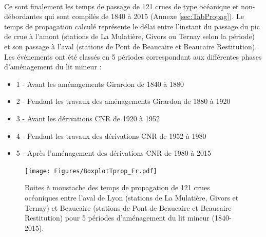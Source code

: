 \documentclass[11pt]{article}
\begin{document}
	\paragraph{} Ce sont finalement les temps de passage de 121 crues de type océanique et non-débordantes qui sont compilés de 1840 à 2015 (Annexe \ref{sec:TabPropag}). Le temps de propagation calculé représente le délai entre l'instant du passage du pic de crue à l'amont (stations de La Mulatière, Givors ou Ternay selon la période) et son passage à l'aval (stations de Pont de Beaucaire et Beaucaire Restitution). Les événements ont été classés en 5 périodes correspondant aux différentes phases d'aménagement du lit mineur : 
	\begin{itemize}
		\item 1 - Avant les aménagements Girardon de 1840 à 1880
		\item 2 - Pendant les travaux des aménagements Girardon de 1880 à 1920
		\item 3 - Avant les dérivations CNR de 1920 à 1952
		\item 4 - Pendant les travaux des dérivations CNR de 1952 à 1980
		\item 5 - Après l'aménagement des dérivations CNR de 1980 à 2015
	\end{itemize}

	\begin{figure}[h!]
		\centering
			\texttt{[image: Figures/BoxplotTprop\_Fr.pdf]}
	        \caption{Boites à moustache des temps de propagation de 121 crues océaniques entre l'aval de Lyon (stations de La Mulatière, Givors et Ternay) et Beaucaire (stations de Pont de Beaucaire et Beaucaire Restitution) pour 5 périodes d'aménagement du lit mineur (1840-2015).}
			\label{fig:BoxplotPropag}
		\end{figure}	
\end{document}
